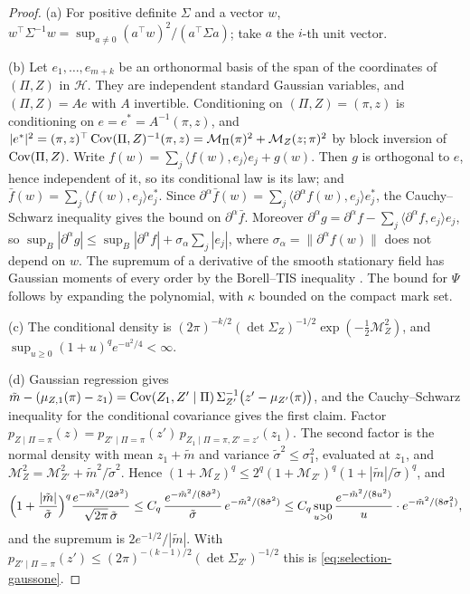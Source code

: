 \begin{proof}
(a) For positive definite $\Sigma$ and a vector $w$, $w^{\top}\Sigma^{-1}w=\sup_{a\ne0}(a^{\top}w)^2/(a^{\top}\Sigma a)$; take $a$ the $i$-th unit vector.

(b) Let $e_1,\dots,e_{m+k}$ be an orthonormal basis of the span of the coordinates of $(\Pi,Z)$ in $\mathcal H$. They are independent standard Gaussian variables, and $(\Pi,Z)=Ae$ with $A$ invertible. Conditioning on $(\Pi,Z)=(\pi,z)$ is conditioning on $e=e^*=A^{-1}(\pi,z)$, and $|e^*|^2=(\pi,z)^{\top}\operatorname{Cov}(\Pi,Z)^{-1}(\pi,z)=\mathcal M_\Pi(\pi)^2+\mathcal M_Z(z;\pi)^2$ by block inversion of $\operatorname{Cov}(\Pi,Z)$. Write $f(w)=\sum_j\langle f(w),e_j\rangle e_j+g(w)$. Then $g$ is orthogonal to $e$, hence independent of it, so its conditional law is its law; and $\bar f(w)=\sum_j\langle f(w),e_j\rangle e^*_j$. Since $\partial^\alpha\bar f(w)=\sum_j\langle\partial^\alpha f(w),e_j\rangle e^*_j$, the Cauchy--Schwarz inequality gives the bound on $\partial^\alpha\bar f$. Moreover $\partial^\alpha g=\partial^\alpha f-\sum_j\langle\partial^\alpha f,e_j\rangle e_j$, so $\sup_B|\partial^\alpha g|\le\sup_B|\partial^\alpha f|+\sigma_\alpha\sum_j|e_j|$, where $\sigma_\alpha=\|\partial^\alpha f(w)\|$ does not depend on $w$. The supremum of a derivative of the smooth stationary field has Gaussian moments of every order by the Borell--TIS inequality \cite{AdlerTaylor}. The bound for $\Psi$ follows by expanding the polynomial, with $\kappa$ bounded on the compact mark set.

(c) The conditional density is $(2\pi)^{-k/2}(\det\Sigma_Z)^{-1/2}\exp(-\frac12\mathcal M_Z^2)$, and $\sup_{u\ge0}(1+u)^qe^{-u^2/4}<\infty$.

(d) Gaussian regression gives $\tilde m-(\mu_{Z,1}(\pi)-z_1)=\operatorname{Cov}(Z_1,Z'\mid\Pi)\,\Sigma_{Z'}^{-1}\bigl(z'-\mu_{Z'}(\pi)\bigr)$, and the Cauchy--Schwarz inequality for the conditional covariance gives the first claim. Factor $p_{Z\mid\Pi=\pi}(z)=p_{Z'\mid\Pi=\pi}(z')\,p_{Z_1\mid\Pi=\pi,Z'=z'}(z_1)$. The second factor is the normal density with mean $z_1+\tilde m$ and variance $\tilde\sigma^2\le\sigma_1^2$, evaluated at $z_1$, and $\mathcal M_Z^2=\mathcal M_{Z'}^2+\tilde m^2/\tilde\sigma^2$. Hence $(1+\mathcal M_Z)^q\le2^q(1+\mathcal M_{Z'})^q(1+|\tilde m|/\tilde\sigma)^q$, and
\[
\Bigl(1+\frac{|\tilde m|}{\tilde\sigma}\Bigr)^q\frac{e^{-\tilde m^2/(2\tilde\sigma^2)}}{\sqrt{2\pi}\,\tilde\sigma}\le C_q\,\frac{e^{-\tilde m^2/(8\tilde\sigma^2)}}{\tilde\sigma}\,e^{-\tilde m^2/(8\tilde\sigma^2)}\le C_q\sup_{u>0}\frac{e^{-\tilde m^2/(8u^2)}}u\cdot e^{-\tilde m^2/(8\sigma_1^2)},
\]
and the supremum is $2e^{-1/2}/|\tilde m|$.
With $p_{Z'\mid\Pi=\pi}(z')\le(2\pi)^{-(k-1)/2}(\det\Sigma_{Z'})^{-1/2}$ this is \eqref{eq:selection-gaussone}.
\end{proof}

